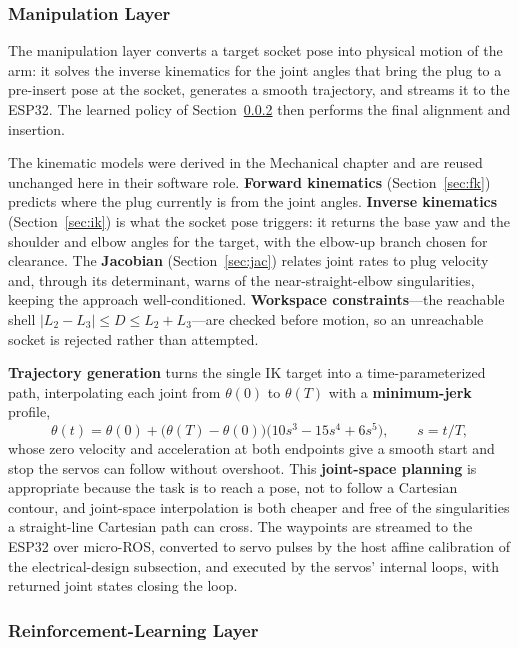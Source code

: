\subsubsection{Manipulation Layer}\label{sec:manipulation}

The manipulation layer converts a target socket pose into physical motion of the arm: it solves the inverse kinematics for the joint angles that bring the plug to a pre-insert pose at the socket, generates a smooth trajectory, and streams it to the ESP32. The learned policy of Section~\ref{sec:rl} then performs the final alignment and insertion.

The kinematic models were derived in the Mechanical chapter and are reused unchanged here in their software role. \textbf{Forward kinematics} (Section~\ref{sec:fk}) predicts where the plug currently is from the joint angles. \textbf{Inverse kinematics} (Section~\ref{sec:ik}) is what the socket pose triggers: it returns the base yaw and the shoulder and elbow angles for the target, with the elbow-up branch chosen for clearance. The \textbf{Jacobian} (Section~\ref{sec:jac}) relates joint rates to plug velocity and, through its determinant, warns of the near-straight-elbow singularities, keeping the approach well-conditioned. \textbf{Workspace constraints}---the reachable shell $|L_2-L_3|\le D\le L_2+L_3$---are checked before motion, so an unreachable socket is rejected rather than attempted.

\textbf{Trajectory generation} turns the single IK target into a time-parameterized path, interpolating each joint from $\theta(0)$ to $\theta(T)$ with a \textbf{minimum-jerk} profile,
$$
\theta(t)=\theta(0)+\big(\theta(T)-\theta(0)\big)\big(10s^3-15s^4+6s^5\big),\qquad s=t/T,
$$
whose zero velocity and acceleration at both endpoints give a smooth start and stop the servos can follow without overshoot. This \textbf{joint-space planning} is appropriate because the task is to reach a pose, not to follow a Cartesian contour, and joint-space interpolation is both cheaper and free of the singularities a straight-line Cartesian path can cross. The waypoints are streamed to the ESP32 over micro-ROS, converted to servo pulses by the host affine calibration of the electrical-design subsection, and executed by the servos' internal loops, with returned joint states closing the loop.

\subsubsection{Reinforcement-Learning Layer}\label{sec:rl}

